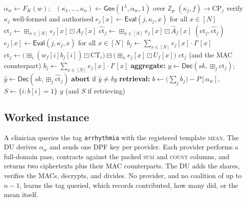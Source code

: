 \documentclass[journal]{IEEEtran}
\newcommand{\Gen}{\mathsf{Gen}}
\newcommand{\Eval}{\mathsf{Eval}}
\newcommand{\Dec}{\mathsf{Dec}}
\newcommand{\bplus}{\boxplus}
\newcommand{\bminus}{\boxminus}
\newcommand{\bdot}{\boxdot}
\begin{document}
\begin{algorithm}[t]
\caption{Query: $\mathsf{Token}$, $\mathsf{FastAgg}$, $\mathsf{GenAgg}$, $\mathsf{Retrieve}$, $\mathsf{CombineDec}$}
\label{alg:query}
\begin{algorithmic}[1]
  \State $\alpha_w\gets F_K(w)$; \ $(\kappa_1,\dots,\kappa_n)\gets\Gen(1^\lambda,\alpha_w,1)$ over $\mathbb{Z}_p$
  \State \Return $(\kappa_j,f)\to\text{CP}_j$
\EndProcedure
\Statex
{} 
  \State verify $\kappa_j$ well-formed and authorised 
  \State $e_j[x]\gets\Eval(j,\kappa_j,x)$ for all $x\in[N]$ 
  \State $\text{ct}_j\gets\bplus_{x\in[N]} e_j[x]\bdot A_f[x]$ 
  \State $\widehat{\text{ct}}_j\gets\bplus_{x\in[N]} e_j[x]\bdot \widehat{A}_f[x]$
  \State \Return $(\text{ct}_j,\widehat{\text{ct}}_j)$ 
\EndProcedure
\Statex
{} 
  \State $e_j[x]\gets\Eval(j,\kappa_j,x)$ for all $x\in[N]$
  \State $b_j\gets\sum_{x\in[N]} e_j[x]\cdot I'[x]$ 
  \State $\text{ct}_j\gets\big(\bplus_i (w_f[i]b_j[i])\bdot\text{CT}_i\big)\bminus\big(\bplus_x e_j[x]\bdot U_f[x]\big)$
  \State \Return $\text{ct}_j$ (and the MAC counterpart)
\EndProcedure
\Statex
{}
  \State \Return $b_j\gets\sum_{x\in[N]} e_j[x]\cdot I'[x]$ 
\EndProcedure
\Statex
{} 
  \State \textbf{aggregate:} $y\gets\Dec(sk,\bplus_j\text{ct}_j)$; $\hat{y}\gets\Dec(sk,\bplus_j\widehat{\text{ct}}_j)$
  \State \textbf{abort} if $\hat{y}\neq\delta y$ 
  \State \textbf{retrieval:} $b\gets\big(\sum_j b_j\big)-P[\alpha_w]$, \ $S\gets\{i: b[i]=1\}$
  \State \Return $y$ (and $S$ if retrieving)
\EndProcedure
\end{algorithmic}
\end{algorithm}

\subsection{Worked instance}
A clinician queries the tag \texttt{arrhythmia} with the registered template \textsc{mean}. The DU derives $\alpha_w$ and sends one DPF key per provider. Each provider performs a full-domain pass, contracts against the packed \textsc{sum} and \textsc{count} columns, and returns two ciphertexts plus their MAC counterparts. The DU adds the shares, verifies the MACs, decrypts, and divides. No provider, and no coalition of up to $n-1$, learns the tag queried, which records contributed, how many did, or the mean itself.
\end{document}

